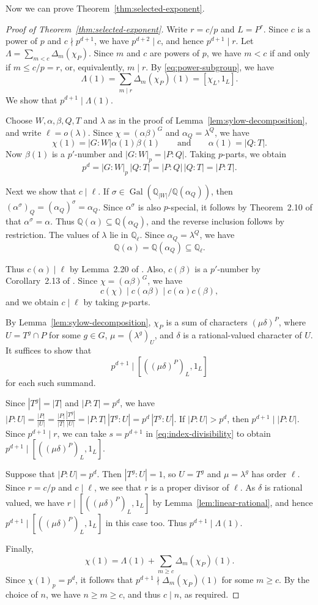 \documentclass[reqno]{amsart}
\theoremstyle{definition}
\theoremstyle{remark}
\numberwithin{equation}{section}
\DeclareMathOperator{\Gal}{Gal}
\theoremstyle{plain}
\begin{document}
Now we can prove Theorem~\ref{thm:selected-exponent}.

\begin{proof}[Proof of Theorem~\ref{thm:selected-exponent}]
Write $r=c/p$ and $L=P^r$. Since $c$ is a power of $p$ and
$c\nmid p^{d+1}$, we have $p^{d+2}\mid c$, and hence
$p^{d+1}\mid r$. Let $\Lambda=\sum_{m<c}\Delta_m(\chi_P)$.
Since $m$ and $c$ are powers of $p$, we have $m<c$ if and only if
$m\leq c/p=r$, or, equivalently, $m\mid r$.
By \eqref{eq:power-subgroup}, we have
\[
  \Lambda(1)=\sum_{m\mid r}\Delta_m(\chi_P)(1)=[\chi_L,1_L].
\]
We show that $p^{d+1}\mid\Lambda(1)$.

Choose $W,\alpha,\beta,Q,T$ and $\lambda$ as in the proof of
Lemma~\ref{lem:sylow-decomposition}, and write $\ell=o(\lambda)$.
Since $\chi=(\alpha\beta)^G$ and $\alpha_Q=\lambda^Q$, we have
\[
  \chi(1)=|G:W|\alpha(1)\beta(1)
  \qquad\text{and}\qquad
  \alpha(1)=|Q:T|.
\]
Now $\beta(1)$ is a $p'$-number and $|G:W|_p=|P:Q|$.
Taking $p$-parts, we obtain
\[
  p^d=|G:W|_p\,|Q:T|=|P:Q|\,|Q:T|=|P:T|.
\]

Next we show that $c\mid\ell$. If
$\sigma\in\Gal(\mathbb{Q}_{|W|}/\mathbb{Q}(\alpha_Q))$, then
$(\alpha^\sigma)_Q=(\alpha_Q)^\sigma=\alpha_Q$.
Since $\alpha^\sigma$ is also $p$-special, it follows by
Theorem~2.10 of \cite{I2018} that $\alpha^\sigma=\alpha$.
Thus $\mathbb{Q}(\alpha)\subseteq\mathbb{Q}(\alpha_Q)$, and the
reverse inclusion follows by restriction. The values of $\lambda$ lie in $\mathbb{Q}_\ell$.
Since $\alpha_Q=\lambda^Q$, we have
\[
  \mathbb{Q}(\alpha)=\mathbb{Q}(\alpha_Q)
  \subseteq\mathbb{Q}_\ell.
\]

Thus $c(\alpha)\mid\ell$ by Lemma~2.20 of \cite{I2018}.
Also, $c(\beta)$ is a $p'$-number by Corollary~2.13 of
\cite{I2018}. Since $\chi=(\alpha\beta)^G$, we have
\[
  c(\chi)\mid c(\alpha\beta)\mid c(\alpha)c(\beta),
\]
and we obtain $c\mid\ell$ by taking $p$-parts.

By Lemma~\ref{lem:sylow-decomposition}, $\chi_P$ is a sum of
characters $(\mu\delta)^P$, where $U=T^g\cap P$ for some
$g\in G$, $\mu=(\lambda^g)_U$, and $\delta$ is a rational-valued
character of $U$. It suffices to show that
\[
  p^{d+1}\mid[((\mu\delta)^P)_L,1_L]
\]
for each such summand.

Since $|T^g|=|T|$ and $|P:T|=p^d$, we have
$|P:U|=\frac{|P|}{|U|}
=\frac{|P|}{|T|}\frac{|T^g|}{|U|}
=|P:T|\,|T^g:U|=p^d\,|T^g:U|$.
If $|P:U|>p^d$, then $p^{d+1}\mid|P:U|$.
Since $p^{d+1}\mid r$, we can take $s=p^{d+1}$ in
\eqref{eq:index-divisibility} to obtain
$p^{d+1}\mid[((\mu\delta)^P)_L,1_L]$.

Suppose  that $|P:U|=p^d$. Then $|T^g:U|=1$, so
$U=T^g$ and $\mu=\lambda^g$ has order $\ell$.
Since $r=c/p$ and $c\mid\ell$, we see that $r$ is a proper divisor
of $\ell$. As $\delta$ is rational valued, we have
$r\mid[((\mu\delta)^P)_L,1_L]$ by
Lemma~\ref{lem:linear-rational}, and hence
$p^{d+1}\mid[((\mu\delta)^P)_L,1_L]$ in this case too.
Thus $p^{d+1}\mid\Lambda(1)$.

Finally,
\[
  \chi(1)=\Lambda(1)+\sum_{m\geq c}\Delta_m(\chi_P)(1).
\]
Since $\chi(1)_p=p^d$, it follows that
$p^{d+1}\nmid\Delta_m(\chi_P)(1)$ for some $m\geq c$.
By the choice of $n$, we have $n\geq m\geq c$, and thus
$c\mid n$, as required.
\end{proof}
\end{document}

